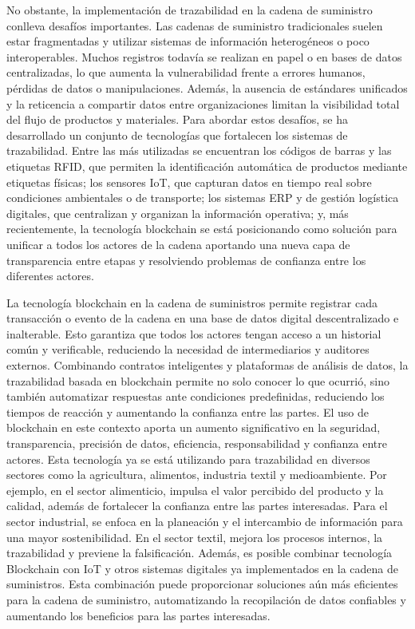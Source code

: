 No obstante, la implementación de trazabilidad en la cadena de suministro conlleva desafíos importantes. Las cadenas de suministro tradicionales suelen estar fragmentadas y utilizar sistemas de información heterogéneos o poco interoperables. Muchos registros todavía se realizan en papel o en bases de datos centralizadas, lo que aumenta la vulnerabilidad frente a errores humanos, pérdidas de datos o manipulaciones. Además, la ausencia de estándares unificados y la reticencia a compartir datos entre organizaciones limitan la visibilidad total del flujo de productos y materiales. Para abordar estos desafíos, se ha desarrollado un conjunto de tecnologías que fortalecen los sistemas de trazabilidad. Entre las más utilizadas se encuentran los códigos de barras y las etiquetas RFID, que permiten la identificación automática de productos mediante etiquetas físicas; los sensores IoT, que capturan datos en tiempo real sobre condiciones ambientales o de transporte; los sistemas ERP y de gestión logística digitales, que centralizan y organizan la información operativa; y, más recientemente, la tecnología blockchain se está posicionando como solución para unificar a todos los actores de la cadena aportando una nueva capa de transparencia entre etapas y resolviendo problemas de confianza entre los diferentes actores.

La tecnología blockchain en la cadena de suministros permite registrar cada transacción o evento de la cadena en una base de datos digital descentralizado e inalterable. Esto garantiza que todos los actores tengan acceso a un historial común y verificable, reduciendo la necesidad de intermediarios y auditores externos. Combinando contratos inteligentes y plataformas de análisis de datos, la trazabilidad basada en blockchain permite no solo conocer lo que ocurrió, sino también automatizar respuestas ante condiciones predefinidas, reduciendo los tiempos de reacción y aumentando la confianza entre las partes. El uso de blockchain en este contexto aporta un aumento significativo en la seguridad, transparencia, precisión de datos, eficiencia, responsabilidad y confianza entre actores. Esta tecnología ya se está utilizando para trazabilidad en diversos sectores como la agricultura, alimentos, industria textil y medioambiente. Por ejemplo, en el sector alimenticio, impulsa el valor percibido del producto y la calidad, además de fortalecer la confianza entre las partes interesadas. Para el sector industrial, se enfoca en la planeación y el intercambio de información para una mayor sostenibilidad. En el sector textil, mejora los procesos internos, la trazabilidad y previene la falsificación. Además, es posible combinar tecnología Blockchain con IoT y otros sistemas digitales ya implementados en la cadena de suministros. Esta combinación puede proporcionar soluciones aún más eficientes para la cadena de suministro, automatizando la recopilación de datos confiables y aumentando los beneficios para las partes interesadas.

